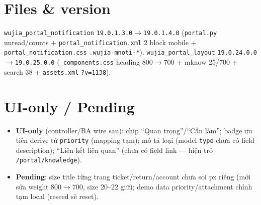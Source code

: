\section{Files \& version}

\texttt{wujia\_portal\_notification} \texttt{19.0.1.3.0}$\to$\texttt{19.0.1.4.0} (\texttt{portal.py} unread/counts
+ \texttt{portal\_notification.xml} 2 block mobile + \texttt{portal\_notification.css} \texttt{.wujia-mnoti-*}).
\texttt{wujia\_portal\_layout} \texttt{19.0.24.0.0}$\to$\texttt{19.0.25.0.0} (\texttt{\_components.css} heading
800$\to$700 + mknow 25/700 + search 38 + \texttt{assets.xml} \texttt{?v=1138}).

\section{UI-only / Pending}

\begin{itemize}
  \item \textbf{UI-only} (controller/BA wire sau): chip ``Quan trọng''/``Cần làm''; badge ưu tiên derive từ
        \texttt{priority} (mapping tạm); mô tả loại (model \texttt{type} chưa có field description); ``Liên kết
        liên quan'' (chưa có field link --- hiện trỏ \texttt{/portal/knowledge}).
  \item \textbf{Pending}: size title từng trang ticket/return/account chưa soi px riêng (mới sửa weight
        800$\to$700, size 20--22 giữ); demo data priority/attachment chỉnh tạm local (reseed sẽ reset).
\end{itemize}
